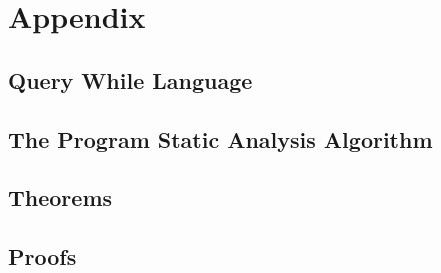 \chapter{Appendix}
\label{AppC}


% 
\section{Query While Language}
\label{appendix:language}

\clearpage


\section{The Program Static Analysis Algorithm}
\label{appendix:adaptfun}


\section{Theorems}
\label{appendix:theorem}

\clearpage

\section{Proofs}
\label{appendix:proof}

\clearpage